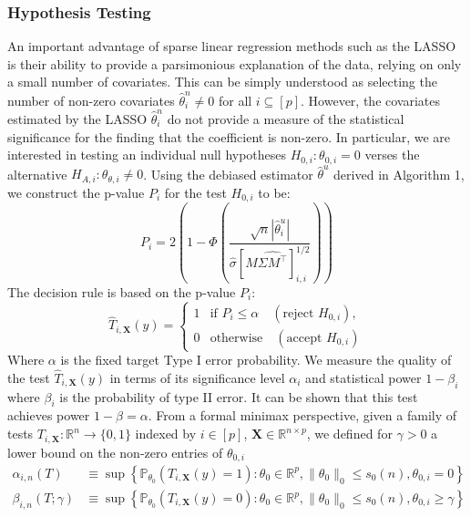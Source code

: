 \documentclass{article}
\begin{document}
\subsubsection{Hypothesis Testing}
\label{sec:2.3.2}
An important advantage of sparse linear regression methods such as the LASSO is their ability to provide a parsimonious explanation of the data, relying on only a small number of covariates. This can be simply understood as selecting the number of non-zero covariates $\hat{\theta}^n_i \neq 0$ for all $i \subseteq [p]$. However, the covariates estimated by the LASSO $\hat{\theta}^n_i$ do not provide a measure of the statistical significance for the finding that the coefficient is non-zero. In particular, we are interested in testing an individual null hypotheses $H_{0,i}: \theta_{0,i} = 0$ verses the alternative $H_{A,i}: \theta_{\theta,i} \neq 0$. Using the debiased estimator $\hat{\theta}^u$ derived in Algorithm 1, we construct the p-value $P_i$ for the test $H_{0,i}$ to be: 
\begin{equation}
    P_{i} = 2 \left(1 - \Phi\left(\frac{\sqrt{n}|\hat{\theta}^{u}_i |}{\hat{\sigma}[M \hat{\Sigma M^\top}]^{1/2}_{i,i}}\right) \right)
\end{equation}
The decision rule is based on the p-value $P_i$:
\begin{equation}
    \widehat{T}_{i, \mathbf{X}}(y) = \begin{cases}
        1 & \text{if } P_i \le \alpha \quad (\text{reject } H_{0,i}), \\
        0 & \text{otherwise} \quad (\text{accept } H_{0,i})
    \end{cases}
\end{equation}
Where $\alpha$ is the fixed target Type I error probability. We measure the quality of the test $ \widehat{T}_{i, \mathbf{X}}(y)$ in terms of its significance level $\alpha_i$ and statistical power $1- \beta_i$ where $\beta_i$ is the probability of type II error. It can be shown that this test achieves power $1 - \beta =\alpha$. From a formal minimax perspective, given a family of tests $T_{i, \mathbf{X}}:\mathbb{R}^n \to \{ 0, 1\}$ indexed by $i \in [p]$, $\mathbf{X} \in \mathbb{R}^{n\times p}$, we defined for $\gamma >0$ a lower bound on the non-zero entries of $\theta_{0,i}$
\begin{equation}
    \begin{aligned}
        \alpha_{i, n}(T) &\equiv \sup \left\{\mathbb{P}_{\theta_0}(T_{i,\mathbf{X}}(y)= 1):\theta_0 \in \mathbb{R}^p, \|\theta_0\|_0 \le s_0(n), \theta_{0,i} = 0 \right\}\\
        \beta_{i, n}(T; \gamma) & \equiv\sup \left\{\mathbb{P}_{\theta_0}(T_{i,\mathbf{X}}(y)= 0):\theta_0 \in \mathbb{R}^p, \|\theta_0\|_0 \le s_0(n), \theta_{0,i} \ge \gamma \right\}
    \end{aligned}
\end{equation}
\end{document}

